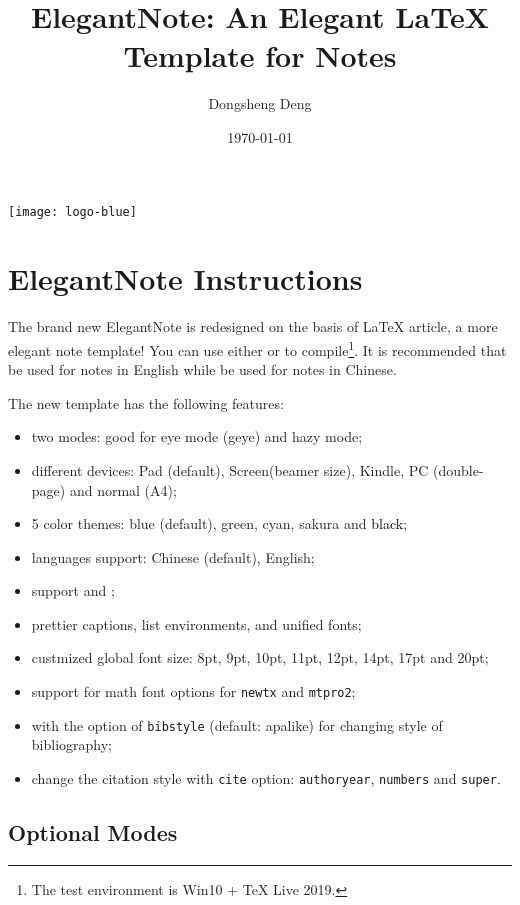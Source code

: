 \documentclass[en,hazy,screen,blue,14pt]{elegantnote}
\title{ElegantNote: An Elegant \LaTeX{} Template for Notes}
\author{Dongsheng Deng}
\institute{Elegant\LaTeX{} Program}
\date{\today}
\begin{document}
\maketitle
\centerline{\texttt{[image: logo-blue]}}

\section{ElegantNote Instructions}
\thispagestyle{empty}
The brand new ElegantNote is redesigned on the basis of \LaTeX{} article, a more elegant note template! You can use either  or  to compile\footnote{The test environment is Win10 + \TeX{} Live 2019.}. It is recommended that  be used for notes in English while  be used for notes in Chinese.

The new template has the following features:
\begin{itemize}
  \item two modes: good for eye mode (geye) and hazy mode;
  \item different devices: Pad (default), Screen(beamer size), Kindle, PC (double-page) and normal (A4);
  \item 5 color themes: \textcolor{eblue}{blue} (default),  \textcolor{egreen}{green}, \textcolor{ecyan}{cyan}, \textcolor{sakura}{sakura} and \textcolor{black}{black};
  \item languages support: Chinese (default), English;
  \item support  and ;
  \item prettier captions, list environments, and unified fonts;
  \item custmized global font size: 8pt, 9pt, 10pt, 11pt, 12pt, 14pt, 17pt and 20pt;
  \item support for math font options for \lstinline{newtx} and \lstinline{mtpro2};
  \item with the option of \lstinline{bibstyle} (default: apalike) for changing style of bibliography;
  \item change the citation style with \lstinline{cite} option: \lstinline{authoryear}, \lstinline{numbers} and \lstinline{super}.
\end{itemize}

\subsection{Optional Modes}
\end{document}

